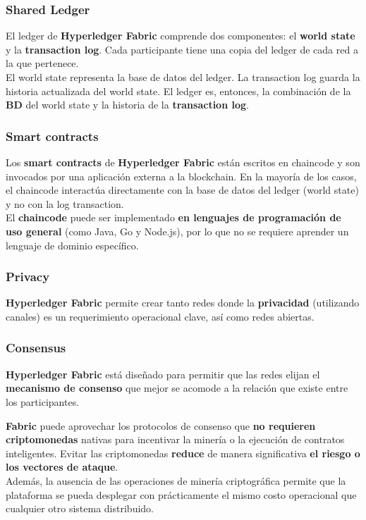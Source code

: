 \documentclass{beamer}
\begin{document}
	\begin{frame}
		\frametitle{Shared Ledger}
		El ledger de \textbf{Hyperledger Fabric} comprende dos componentes: el \textbf{world state} y la \textbf{transaction log}. Cada participante tiene una copia del ledger de cada red a la que pertenece.\\
		\vspace{4mm}
		El world state representa la base de datos del ledger. La transaction log guarda la historia actualizada del world state. El ledger es, entonces, la combinación de la \textbf{BD} del world state y la historia de la \textbf{transaction log}.
	\end{frame}
	
	\begin{frame}
		\frametitle{Smart contracts}
		Los \textbf{smart contracts} de \textbf{Hyperledger Fabric} están escritos en chaincode y son invocados por una aplicación externa a la blockchain. En la mayoría de los casos, el chaincode interactúa directamente con la base de datos del ledger (world state) y no con la log transaction.\\
		\vspace{4mm}
		El \textbf{chaincode} puede ser implementado \textbf{en lenguajes de programación de uso general} (como Java, Go y Node.js), por lo que no se requiere aprender un lenguaje de dominio específico.\\
	\end{frame}

	\begin{frame}
		\frametitle{Privacy}
		\textbf{Hyperledger Fabric} permite crear tanto redes donde la \textbf{privacidad} (utilizando canales) es un requerimiento operacional clave, así como redes abiertas.
	\end{frame}
	
	\begin{frame}
		\frametitle{Consensus}
		\textbf{Hyperledger Fabric} está diseñado para permitir que las redes elijan el \textbf{mecanismo de consenso} que mejor se acomode a la relación que existe entre los participantes.
	\end{frame}
		
	\begin{frame}
		\textbf{Fabric} puede aprovechar los protocolos de consenso que \textbf{no requieren criptomonedas} nativas para incentivar la minería o la ejecución de contratos inteligentes. Evitar las criptomonedas \textbf{reduce} de manera significativa \textbf{el riesgo o los vectores de ataque}.\\
		\vspace{4mm}
		Además, la ausencia de las operaciones de minería criptográfica permite que la plataforma se pueda desplegar con prácticamente el mismo costo operacional que cualquier otro sistema distribuido. 
	\end{frame}
	
\end{document}
